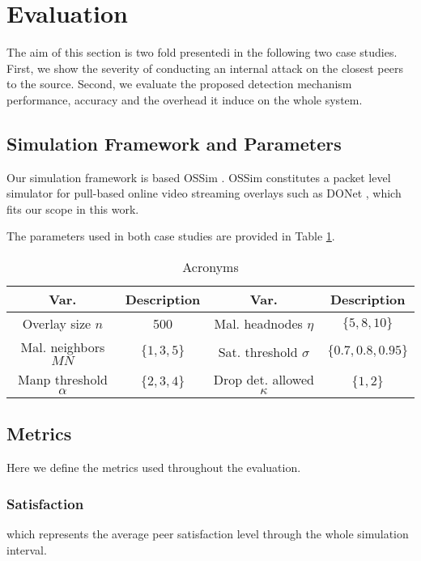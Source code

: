 \section{Evaluation}
\label{sec:eval}

The aim of this section is two fold presentedi in the following two case studies.
First, we show the severity of conducting an internal attack on the closest peers to the source.
Second, we evaluate the proposed detection mechanism performance, accuracy and the overhead it induce on the whole system.

\subsection{Simulation Framework and Parameters}
Our simulation framework is based OSSim \cite{nguyen2013ossim}. 
OSSim constitutes a packet level simulator for pull-based online video streaming overlays such as DONet \cite{zhang2005coolstreaming}, which fits our scope in this work.


The parameters used in both case studies are provided in Table \ref{tab:parameters}.

\begin{table}[ht]
\center
\caption{Acronyms}
\begin{tabular}{|c|c||c|c|}
\hline

\bf{Var.} & \bf{Description}  & \bf{Var.} & \bf{Description} \\\hline\hline
Overlay size $n$ & 500 & Mal. headnodes $\eta$ & $\{5,8,10\}$\\\hline
Mal. neighbors $MN$ & $\{1,3,5\}$ & Sat. threshold $\sigma$ & $\{0.7,0.8,0.95\}$\\\hline
Manp threshold $\alpha$ & $\{2,3,4\}$& Drop det. allowed $\kappa$ & $\{1,2\}$ \\\hline

\end{tabular}
\label{tab:parameters}
\end{table}

\subsection{Metrics}

Here we define the metrics used throughout the evaluation.
\subsubsection*{Satisfaction} which represents the average peer satisfaction level through the whole simulation interval.
